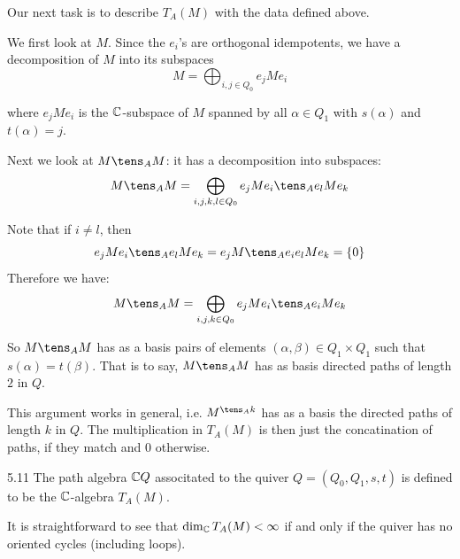 \documentclass[twoside = false,	%
		headsepline,		%
		parskip = true,
		]{scrbook}						%
\begin{document}
    Our next task is to describe $T_A(M)$ with the data defined above.

    We first look at $M$. Since the $e_i$'s are orthogonal idempotents, we have a decomposition of $M$ into its subspaces
    \begin{equation*}
        M = \bigoplus_{i,j \in Q_0} e_j M e_i
    \end{equation*}

    where $e_j M e_i$ is the $\mathbb C$-subspace of $M$ spanned by all $\alpha \in Q_1$ with $s(\alpha)$ and $t(\alpha) = j$.

    Next we look at $M \tens_A M$: it has a decomposition into subspaces:
    \begin{equation*}
        M \tens_A M = \bigoplus_{i,j,k,l \in Q_0} e_j M e_i \tens_A e_l M e_k
    \end{equation*}

    Note that if $i \neq l$, then
    \begin{equation*}
        e_j M e_i \tens_A e_l M e_k = e_j M \tens_A e_ie_l M e_k = \{0\}  
    \end{equation*}
    Therefore we have:
    \begin{equation*}
        M \tens_A M = \bigoplus_{i,j,k \in Q_0} e_j M e_i \tens_A e_i M e_k
    \end{equation*}

    So $M \tens_A M$ has as a basis pairs of elements $(\alpha,\beta) \in Q_1 \times Q_1$ such that $s(\alpha) = t(\beta)$. That is to say, $M \tens_A M$ has as basis directed paths of length $2$ in $Q$.

    This argument works in general, i.e. $M^{\tens_A k}$ has as a basis the directed paths of length $k$ in $Q$. The multiplication in $T_A(M)$ is then just the concatination of paths, if they match and $0$ otherwise.

    \begin{definition}{}{5.11}
        The path algebra $\mathbb C Q$ associtated to the quiver $Q = (Q_0,Q_1,s,t)$ is defined to be the $\mathbb C$-algebra $T_A(M)$.
    \end{definition}

    It is straightforward to see that $\dim_\mathbb C T_A(M) < \infty$ if and only if the quiver has no oriented cycles (including loops).
\end{document}
